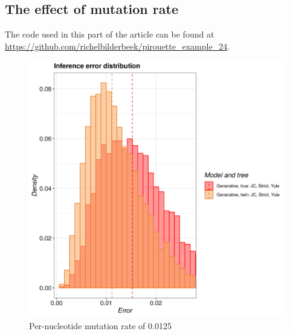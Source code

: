 \subsection{The effect of mutation rate}

The code used in this part of the article can be found at 
\url{https://github.com/richelbilderbeek/pirouette_example_24}.

\begin{figure}[H]
  \includegraphics[width=\textwidth]{pirouette_example_24/example_24_314/errors.png}
  \caption{Per-nucleotide mutation rate of 0.0125}
\end{figure}


